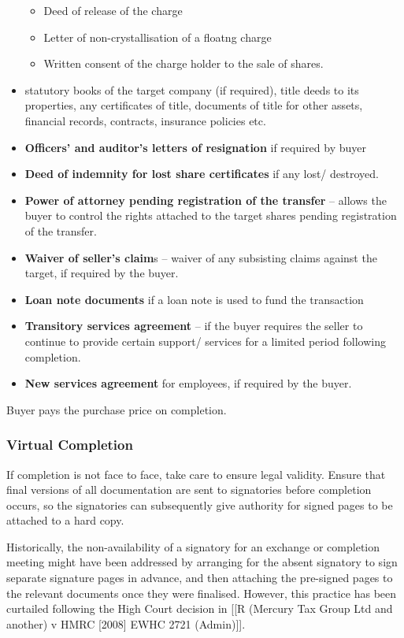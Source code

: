 \documentclass[
]{article}
\providecommand{\tightlist}{%
  \setlength{\itemsep}{0pt}\setlength{\parskip}{0pt}}
\begin{document}
\begin{itemize}
  \begin{itemize}
  \tightlist
  \item
    Deed of release of the charge
  \item
    Letter of non-crystallisation of a floatng charge
  \item
    Written consent of the charge holder to the sale of shares.
  \end{itemize}
\item
  statutory books of the target company (if required), title deeds to
  its properties, any certificates of title, documents of title for
  other assets, financial records, contracts, insurance policies etc.
\item
  \textbf{Officers' and auditor's letters of resignation} if required by
  buyer
\item
  \textbf{Deed of indemnity for lost share certificates} if any lost/
  destroyed.
\item
  \textbf{Power of attorney pending registration of the transfer} --
  allows the buyer to control the rights attached to the target shares
  pending registration of the transfer.
\item
  \textbf{Waiver of seller's claim}s -- waiver of any subsisting claims
  against the target, if required by the buyer.
\item
  \textbf{Loan note documents} if a loan note is used to fund the
  transaction
\item
  \textbf{Transitory services agreement} -- if the buyer requires the
  seller to continue to provide certain support/ services for a limited
  period following completion.
\item
  \textbf{New services agreement} for employees, if required by the
  buyer.
\end{itemize}

Buyer pays the purchase price on completion.

\hypertarget{virtual-completion}{%
\subsubsection{Virtual Completion}\label{virtual-completion}}

If completion is not face to face, take care to ensure legal validity.
Ensure that final versions of all documentation are sent to signatories
before completion occurs, so the signatories can subsequently give
authority for signed pages to be attached to a hard copy.

Historically, the non-availability of a signatory for an exchange or
completion meeting might have been addressed by arranging for the absent
signatory to sign separate signature pages in advance, and then
attaching the pre-signed pages to the relevant documents once they were
finalised. However, this practice has been curtailed following the High
Court decision in {[}{[}R (Mercury Tax Group Ltd and another) v HMRC
{[}2008{]} EWHC 2721 (Admin){]}{]}.
\end{document}

